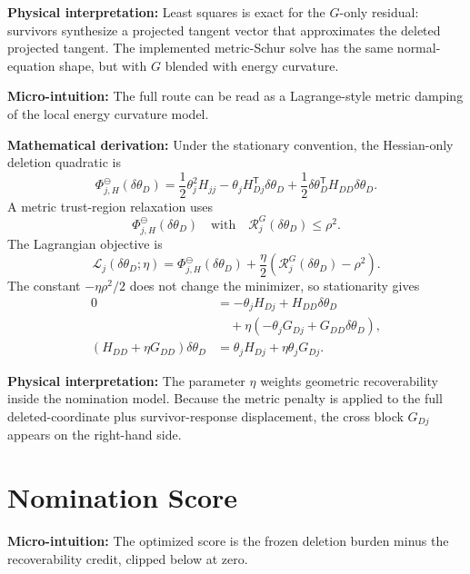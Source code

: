 \documentclass[10pt,twocolumn]{article}
\newcommand{\blocktitle}[1]{\vspace{2pt}\noindent\textbf{#1}\space}
\newcommand{\micro}[1]{\blocktitle{Micro-intuition:} #1}
\newcommand{\deriv}{\blocktitle{Mathematical derivation:}}
\newcommand{\phys}[1]{\blocktitle{Physical interpretation:} #1}
\begin{document}
\phys{Least squares is exact for the \(G\)-only residual: survivors synthesize a projected tangent vector that approximates the deleted projected tangent. The implemented metric-Schur solve has the same normal-equation shape, but with \(G\) blended with energy curvature.}

\micro{The full route can be read as a Lagrange-style metric damping of the local energy curvature model.}

\deriv
Under the stationary convention, the Hessian-only deletion quadratic is
\[
\Phi_{j,H}^\ominus(\delta\theta_D)
=
\frac12\theta_j^2H_{jj}
-\theta_jH_{Dj}^{\mathsf T}\delta\theta_D
+\frac12\delta\theta_D^{\mathsf T}H_{DD}\delta\theta_D.
\]
A metric trust-region relaxation uses
\[
\Phi_{j,H}^\ominus(\delta\theta_D)
\quad
\text{with}
\quad
\mathcal R_j^G(\delta\theta_D)\le\rho^2 .
\]
The Lagrangian objective is
\[
\mathcal L_j(\delta\theta_D;\eta)
=
\Phi_{j,H}^\ominus(\delta\theta_D)
+
\frac{\eta}{2}
\left(
\mathcal R_j^G(\delta\theta_D)-\rho^2
\right).
\]
The constant \(-\eta\rho^2/2\) does not change the minimizer, so stationarity gives
\[
\begin{aligned}
0
&=
-\theta_jH_{Dj}
+H_{DD}\delta\theta_D
\\
&\quad
+\eta\left(-\theta_jG_{Dj}+G_{DD}\delta\theta_D\right),
\\
(H_{DD}+\eta G_{DD})
\delta\theta_D
&=
\theta_jH_{Dj}+\eta\theta_jG_{Dj}.
\end{aligned}
\]

\phys{The parameter \(\eta\) weights geometric recoverability inside the nomination model. Because the metric penalty is applied to the full deleted-coordinate plus survivor-response displacement, the cross block \(G_{Dj}\) appears on the right-hand side.}

\section*{Nomination Score}

\micro{The optimized score is the frozen deletion burden minus the recoverability credit, clipped below at zero.}
\end{document}
